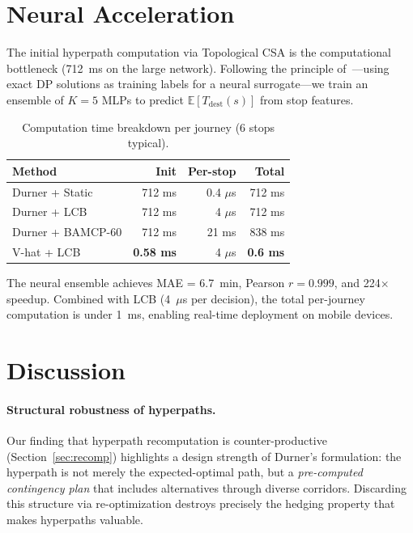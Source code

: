 \documentclass[journal]{IEEEtran}
\begin{document}
\section{Neural Acceleration}
\label{sec:neural}

The initial hyperpath computation via Topological CSA is the computational bottleneck (712~ms on the large network). Following the principle of~\cite{cappart2020}---using exact DP solutions as training labels for a neural surrogate---we train an ensemble of $K = 5$ MLPs to predict $\mathbb{E}[T_{\mathrm{dest}}(s)]$ from stop features.

\begin{table}[t]
\centering
\caption{Computation time breakdown per journey (6 stops typical).}
\label{tab:timing}
\begin{tabular}{lrrr}
\toprule
Method & Init & Per-stop & Total \\
\midrule
Durner + Static & 712 ms & 0.4 $\mu$s & 712 ms \\
Durner + LCB & 712 ms & 4 $\mu$s & 712 ms \\
Durner + BAMCP-60 & 712 ms & 21 ms & 838 ms \\
V-hat + LCB & \textbf{0.58 ms} & 4 $\mu$s & \textbf{0.6 ms} \\
\bottomrule
\end{tabular}
\end{table}

The neural ensemble achieves MAE = 6.7~min, Pearson $r = 0.999$, and 224$\times$ speedup. Combined with LCB (4~$\mu$s per decision), the total per-journey computation is under 1~ms, enabling real-time deployment on mobile devices.

\section{Discussion}
\label{sec:discussion}

\paragraph{Structural robustness of hyperpaths.} Our finding that hyperpath recomputation is counter-productive (Section~\ref{sec:recomp}) highlights a design strength of Durner's formulation: the hyperpath is not merely the expected-optimal path, but a \emph{pre-computed contingency plan} that includes alternatives through diverse corridors. Discarding this structure via re-optimization destroys precisely the hedging property that makes hyperpaths valuable.
\end{document}

